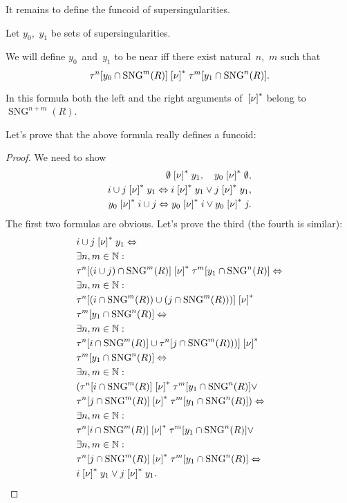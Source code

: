 It remains to define the funcoid of supersingularities.

Let $y_0$,~$y_1$ be sets of supersingularities.

We will define $y_0$~and~$y_1$ to be near iff
there exist natural~$n$,~$m$ such that
\[ \tau^n[y_0\cap\operatorname{SNG}^m(R)] \mathrel{\left[\nu\right]^{\ast}}
\tau^m[y_1\cap\operatorname{SNG}^n(R)]. \]

\begin{rem}
In this formula both the left and the right arguments of~$\mathrel{\left[\nu\right]^{\ast}}$ belong to $\operatorname{SNG}^{n+m}(R)$.
\end{rem}

Let's prove that the above formula really defines a funcoid:

\begin{proof}
We need to show
\begin{align*}
\emptyset\mathrel{\left[\nu\right]^{\ast}}y_1,\quad
y_0\mathrel{\left[\nu\right]^{\ast}}\emptyset,\\
i\cup j\mathrel{\left[\nu\right]^{\ast}}y_1 \Leftrightarrow
i\mathrel{\left[\nu\right]^{\ast}}y_1\lor j\mathrel{\left[\nu\right]^{\ast}}y_1,\\
y_0\mathrel{\left[\nu\right]^{\ast}}i\cup j \Leftrightarrow
y_0\mathrel{\left[\nu\right]^{\ast}}i\lor y_0\mathrel{\left[\nu\right]^{\ast}}j.
\end{align*}
The first two formulas are obvious. Let's prove the third (the fourth is similar):
\begin{align*}
&i\cup j\mathrel{\left[\nu\right]^{\ast}}y_1 \Leftrightarrow \\&
\exists n,m\in\mathbb{N}:\\& 
\tau^n[(i\cup j)\cap\operatorname{SNG}^m(R)] \mathrel{\left[\nu\right]^{\ast}}
\tau^m[y_1\cap\operatorname{SNG}^n(R)] \Leftrightarrow \\&
\exists n,m\in\mathbb{N}:\\& 
\tau^n[(i\cap\operatorname{SNG}^m(R))\cup(j\cap\operatorname{SNG}^m(R)))] \mathrel{\left[\nu\right]^{\ast}}\\&
\tau^m[y_1\cap\operatorname{SNG}^n(R)] \Leftrightarrow \\&
\exists n,m\in\mathbb{N}:\\& 
\tau^n[i\cap\operatorname{SNG}^m(R)]\cup\tau^n[j\cap\operatorname{SNG}^m(R)))] \mathrel{\left[\nu\right]^{\ast}}\\&
\tau^m[y_1\cap\operatorname{SNG}^n(R)] \Leftrightarrow \\&
\exists n,m\in\mathbb{N}:\\& 
(\tau^n[i\cap\operatorname{SNG}^m(R)]\mathrel{\left[\nu\right]^{\ast}}
\tau^m[y_1\cap\operatorname{SNG}^n(R)] \lor \\&
\tau^n[j\cap\operatorname{SNG}^m(R)]\mathrel{\left[\nu\right]^{\ast}}
\tau^m[y_1\cap\operatorname{SNG}^n(R)]) \Leftrightarrow \\&
\exists n,m\in\mathbb{N}:\\& 
\tau^n[i\cap\operatorname{SNG}^m(R)]\mathrel{\left[\nu\right]^{\ast}}
\tau^m[y_1\cap\operatorname{SNG}^n(R)] \lor \\&
\exists n,m\in\mathbb{N}:\\& 
\tau^n[j\cap\operatorname{SNG}^m(R)]\mathrel{\left[\nu\right]^{\ast}}
\tau^m[y_1\cap\operatorname{SNG}^n(R)] \Leftrightarrow \\&
i\mathrel{\left[\nu\right]^{\ast}}y_1\lor j\mathrel{\left[\nu\right]^{\ast}}y_1.
\end{align*}
\end{proof}


